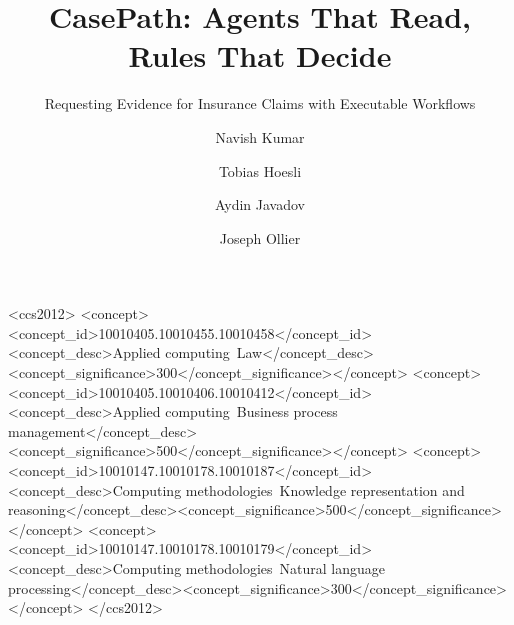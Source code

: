 \documentclass[acmsmall,screen,nonacm]{acmart}
\begin{document}
\title{CasePath: Agents That Read, Rules That Decide}
\subtitle{Requesting Evidence for Insurance Claims with Executable Workflows}

\author{Navish Kumar}
\author{Tobias Hoesli}
\author{Aydin Javadov}
\author{Joseph Ollier}
\renewcommand{\shortauthors}{Kumar et al.}



\begin{CCSXML}
<ccs2012>
<concept><concept_id>10010405.10010455.10010458</concept_id><concept_desc>Applied computing~Law</concept_desc><concept_significance>300</concept_significance></concept>
<concept><concept_id>10010405.10010406.10010412</concept_id><concept_desc>Applied computing~Business process management</concept_desc><concept_significance>500</concept_significance></concept>
<concept><concept_id>10010147.10010178.10010187</concept_id><concept_desc>Computing methodologies~Knowledge representation and reasoning</concept_desc><concept_significance>500</concept_significance></concept>
<concept><concept_id>10010147.10010178.10010179</concept_id><concept_desc>Computing methodologies~Natural language processing</concept_desc><concept_significance>300</concept_significance></concept>
</ccs2012>
\end{CCSXML}


\maketitle










\end{document}
